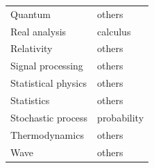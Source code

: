 \begin{table}
\begin{tabular}{ll}
    Quantum & others \\
    Real analysis & calculus \\
    Relativity & others \\
    Signal processing & others \\
    Statistical physics & others \\
    Statistics & others \\
    Stochastic process & probability \\
    Thermodynamics & others \\
    Wave & others \\
    \bottomrule
\end{tabular}
\label{tab:theoremqa}
\end{table}